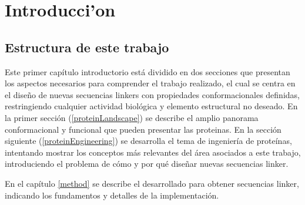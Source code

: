 \chapter{Introducci'on}
% 



\section{Estructura de este trabajo}

Este primer capítulo introductorio está dividido en dos secciones que presentan los aspectos necesarios para comprender el trabajo realizado, el cual se centra en el diseño de nuevas secuencias linkers con 
propiedades conformacionales definidas, restringiendo cualquier actividad biológica y elemento estructural no deseado.
En la primer sección (\ref{proteinLandscape}) se describe el amplio panorama conformacional y funcional que pueden presentar las proteinas.
En la sección siguiente (\ref{proteinEngineering}) se desarrolla el tema de ingeniería de proteínas, intentando mostrar los conceptos más relevantes del área asociados a este trabajo, 
introduciendo el problema de cómo y por qué diseñar nuevas secuencias linker.

En el capítulo \ref{method} se describe el desarrollado para obtener secuencias linker, indicando los fundamentos y detalles de la implementación.

